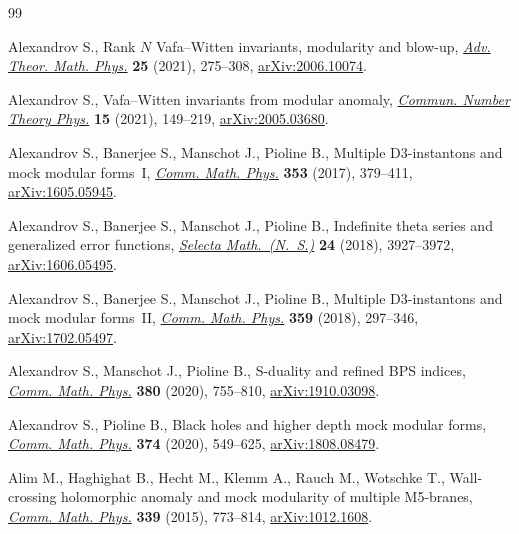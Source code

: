 \documentclass[10pt,a4paper]{amsart}
\theoremstyle{definition}
\numberwithin{equation}{section}
\begin{document}
\begin{thebibliography}{99}
\footnotesize\itemsep=0pt

Alexandrov S., Rank {$N$} {V}afa--{W}itten invariants, modularity and blow-up,
 \href{https://doi.org/10.4310/ATMP.2021.v25.n2.a1}{\textit{Adv. Theor. Math. Phys.}} \textbf{25} (2021), 275--308,
 \href{https://arxiv.org/abs/2006.10074}{arXiv:2006.10074}.

Alexandrov S., Vafa--{W}itten invariants from modular anomaly, \href{https://doi.org/10.4310/CNTP.2021.v15.n1.a4}{\textit{Commun.
 Number Theory Phys.}} \textbf{15} (2021), 149--219, \href{https://arxiv.org/abs/2005.03680}{arXiv:2005.03680}.

Alexandrov S., Banerjee S., Manschot J., Pioline B., Multiple {D}3-instantons
 and mock modular forms~{I}, \href{https://doi.org/10.1007/s00220-016-2799-0}{\textit{Comm. Math. Phys.}} \textbf{353} (2017),
 379--411, \href{https://arxiv.org/abs/1605.05945}{arXiv:1605.05945}.

Alexandrov S., Banerjee S., Manschot J., Pioline B., Indefinite theta series
 and generalized error functions, \href{https://doi.org/10.1007/s00029-018-0444-9}{\textit{Selecta Math.~(N.~S.)}} \textbf{24}
 (2018), 3927--3972, \href{https://arxiv.org/abs/1606.05495}{arXiv:1606.05495}.

Alexandrov S., Banerjee S., Manschot J., Pioline B., Multiple {D}3-instantons
 and mock modular forms~{II}, \href{https://doi.org/10.1007/s00220-018-3114-z}{\textit{Comm. Math. Phys.}} \textbf{359} (2018),
 297--346, \href{https://arxiv.org/abs/1702.05497}{arXiv:1702.05497}.

Alexandrov S., Manschot J., Pioline B., S-duality and refined {BPS} indices,
 \href{https://doi.org/10.1007/s00220-020-03854-6}{\textit{Comm. Math. Phys.}} \textbf{380} (2020), 755--810,
 \href{https://arxiv.org/abs/1910.03098}{arXiv:1910.03098}.

Alexandrov S., Pioline B., Black holes and higher depth mock modular forms,
 \href{https://doi.org/10.1007/s00220-019-03609-y}{\textit{Comm. Math. Phys.}} \textbf{374} (2020), 549--625,
 \href{https://arxiv.org/abs/1808.08479}{arXiv:1808.08479}.

Alim M., Haghighat B., Hecht M., Klemm A., Rauch M., Wotschke T., Wall-crossing
 holomorphic anomaly and mock modularity of multiple {M}5-branes,
 \href{https://doi.org/10.1007/s00220-015-2436-3}{\textit{Comm. Math. Phys.}} \textbf{339} (2015), 773--814, \href{https://arxiv.org/abs/1012.1608}{arXiv:1012.1608}.


\end{thebibliography}
\end{document}
